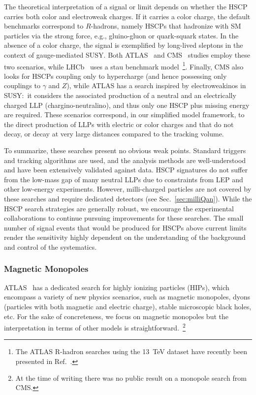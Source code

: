 The theoretical interpretation of a signal or limit depends on whether the HSCP carries both color and electroweak charges. If it carries a color charge, the default benchmarks correspond to $R$-hadrons, namely HSCPs that hadronize with SM particles via the strong force, e.g., gluino-gluon or quark-squark states. In the absence of a color charge, the signal is exemplified by long-lived sleptons in the context of gauge-mediated SUSY. Both ATLAS~\cite{ATLAS:2014fka} and CMS~\cite{CMS:2016ybj} studies employ these two scenarios, while LHCb~\cite{Aaij:2015ica} uses a stau benchmark model~\footnote{The ATLAS R-hadron searches using the 13~TeV dataset have recently been presented in Ref.~\cite{Aaboud:2016uth}. }.
Finally, CMS also looks for HSCPs coupling only to hypercharge (and hence possessing only couplings to $\gamma$ and $Z$), while ATLAS has a search inspired by electroweakinos in SUSY:~it considers the associated production of a neutral and an electrically charged LLP (chargino-neutralino), and thus only one HSCP plus missing energy are required. These scenarios correspond, in our simplified model framework, to the direct production of LLPs with electric or color charges and that do not decay, or decay at very large distances compared to the tracking volume.

To summarize, these searches present no obvious weak points. Standard triggers and tracking algorithms are used, and the analysis methods are well-understood and have been extensively validated against data. HSCP signatures do not suffer from the low-mass gap of many neutral LLPs due to constraints from LEP and other low-energy experiments. However, milli-charged particles are not covered by these searches and require dedicated detectors (see Sec.~\ref{sec:milliQan}). While the HSCP search strategies are generally robust, we encourage the experimental collaborations to continue pursuing improvements for these searches. The small number of signal events that would be produced for HSCPs above current limits render the sensitivity highly dependent on the understanding of the background and control of the systematics.

\subsubsection*{Magnetic Monopoles}

ATLAS~\cite{Aad:2015kta} has a dedicated search for highly ionizing particles (HIPs), which encompass a variety of new physics scenarios, such as magnetic monopoles, dyons (particles with both magnetic and electric charge), stable microscopic black holes, etc. For the sake of concreteness, we focus on magnetic monopoles but the interpretation in terms of other models is straightforward.~\footnote{At the time of writing there was no public result on a monopole search from CMS.}

